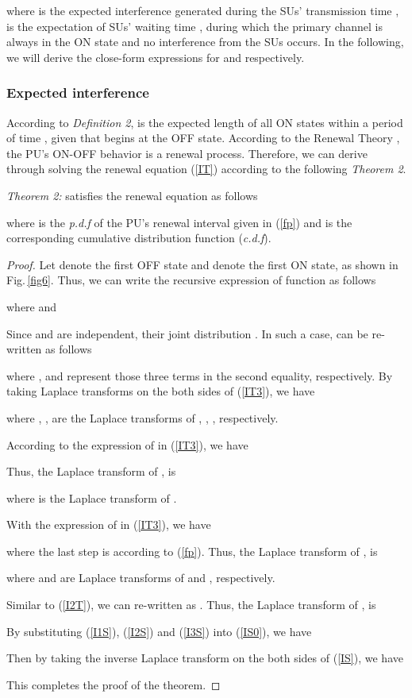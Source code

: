\documentclass[11pt,draftcls]{IEEEtran}{\onecolumn}
\begin{document}
where  is the expected interference generated during the
SUs' transmission time ,  is the expectation
of SUs' waiting time , during which the primary channel is
always in the ON state and no interference from the SUs occurs. In
the following, we will derive the close-form expressions for
 and  respectively.

\subsubsection{Expected interference }\label{It}
According to \emph{Definition 2},  is the expected length of
all ON states within a period of time , given that  begins at
the OFF state. According to the Renewal Theory \cite{renew}, the
PU's ON-OFF behavior is a renewal process. Therefore, we can derive
 through solving the renewal equation (\ref{IT}) according to
the following \emph{Theorem 2}.

\emph{Theorem 2:}  satisfies the renewal equation as follows

where  is the \emph{p.d.f} of the PU's renewal interval
given in (\ref{fp}) and  is the corresponding cumulative
distribution function (\emph{c.d.f}).

\begin{proof}
Let  denote the first OFF state and  denote the first ON
state, as shown in Fig.\,\ref{fig6}. Thus, we can write the
recursive expression of function  as follows

where  and 

Since  and  are independent, their joint distribution
. In
such a case,  can be re-written as follows

where ,  and  represent those three terms in
the second equality, respectively. By taking Laplace transforms on
the both sides of (\ref{IT3}), we have

where , ,  are
the Laplace transforms of , , ,
respectively.

According to the expression of  in (\ref{IT3}), we have

Thus, the Laplace transform of ,  is

where  is
the Laplace transform of .

With the expression of  in (\ref{IT3}), we have

where the last step is according to (\ref{fp}). Thus, the Laplace
transform of ,  is

where  and
 are Laplace
transforms of  and , respectively.

Similar to (\ref{I2T}), we can re-written  as . Thus, the Laplace transform of ,
 is


By substituting (\ref{I1S}), (\ref{I2S}) and (\ref{I3S}) into
(\ref{IS0}), we have

Then by taking the inverse Laplace transform on the both sides of
(\ref{IS}), we have

This completes the proof of the theorem.
\end{proof}
\end{document}
